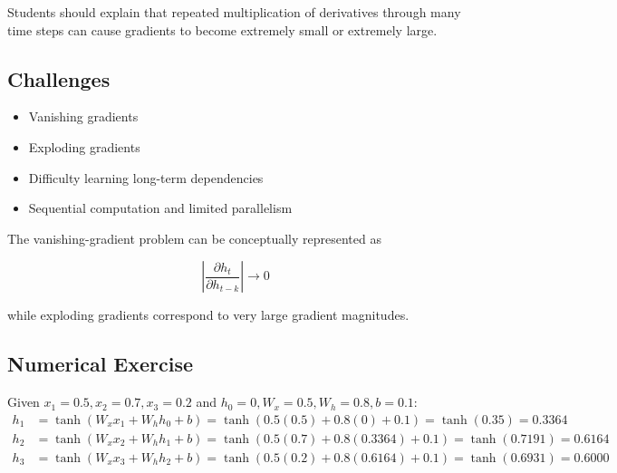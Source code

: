 \documentclass[10pt]{article}
\begin{document}
\begin{center}
\end{center}

Students should explain that repeated multiplication of derivatives through
many time steps can cause gradients to become extremely small or extremely
large.

\subsection*{Challenges}

\begin{itemize}
\item Vanishing gradients
\item Exploding gradients
\item Difficulty learning long-term dependencies
\item Sequential computation and limited parallelism
\end{itemize}

The vanishing-gradient problem can be conceptually represented as

\[
\left|\frac{\partial h_t}{\partial h_{t-k}}\right|\rightarrow0
\]

while exploding gradients correspond to very large gradient magnitudes.

\subsection*{Numerical Exercise}
Given $x_1 = 0.5, x_2 = 0.7, x_3 = 0.2$ and $h_0 = 0, W_x = 0.5, W_h = 0.8, b = 0.1$:
\begin{align*}
h_1 &= \tanh(W_x x_1 + W_h h_0 + b) = \tanh(0.5(0.5) + 0.8(0) + 0.1) = \tanh(0.35) = 0.3364 \\
h_2 &= \tanh(W_x x_2 + W_h h_1 + b) = \tanh(0.5(0.7) + 0.8(0.3364) + 0.1) = \tanh(0.7191) = 0.6164 \\
h_3 &= \tanh(W_x x_3 + W_h h_2 + b) = \tanh(0.5(0.2) + 0.8(0.6164) + 0.1) = \tanh(0.6931) = 0.6000
\end{align*}
\end{document}
